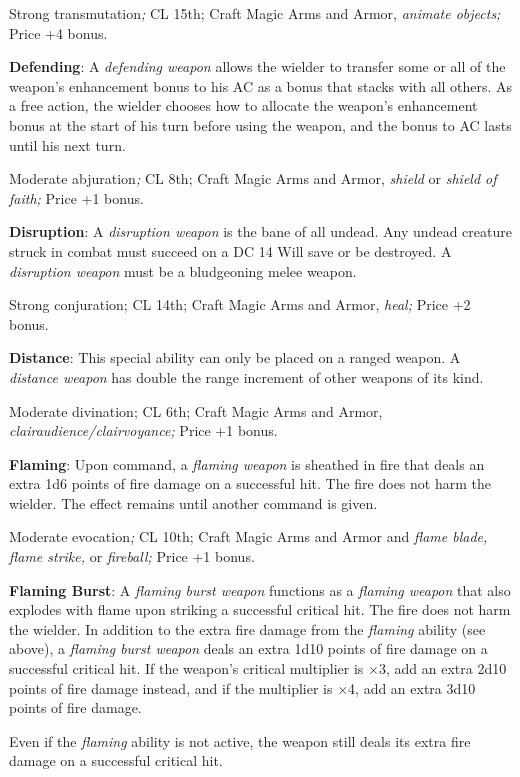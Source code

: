 Strong transmutation\textit{; }CL 15th; Craft Magic Arms and Armor, \textit{animate objects; }Price +4 bonus.
				
\textbf{Defending}: A \textit{defending weapon} allows the wielder to transfer some or all of the weapon's enhancement bonus to his AC as a bonus that stacks with all others. As a free action, the wielder chooses how to allocate the weapon's enhancement bonus at the start of his turn before using the weapon, and the bonus to AC lasts until his next turn.
				
Moderate abjuration\textit{; }CL 8th; Craft Magic Arms and Armor, \textit{shield }or \textit{shield of faith; }Price +1 bonus.
				
\textbf{Disruption}: A \textit{disruption weapon} is the bane of all undead. Any undead creature struck in combat must succeed on a DC 14 Will save or be destroyed. A \textit{disruption weapon} must be a bludgeoning melee weapon.
				
Strong conjuration; CL 14th; Craft Magic Arms and Armor, \textit{heal; }Price +2 bonus.
				
\textbf{Distance}: This special ability can only be placed on a ranged weapon. A \textit{distance weapon} has double the range increment of other weapons of its kind.
				
Moderate divination; CL 6th; Craft Magic Arms and Armor, \textit{clairaudience/clairvoyance; }Price +1 bonus.
				
\textbf{Flaming}: Upon command, a \textit{flaming weapon} is sheathed in fire that deals an extra 1d6 points of fire damage on a successful hit. The fire does not harm the wielder. The effect remains until another command is given. 
				
Moderate evocation\textit{; }CL 10th; Craft Magic Arms and Armor and \textit{flame blade, flame strike, }or \textit{fireball; }Price +1 bonus.
				
\textbf{Flaming Burst}: A \textit{flaming burst weapon} functions as a \textit{flaming weapon} that also explodes with flame upon striking a successful critical hit. The fire does not harm the wielder. In addition to the extra fire damage from the \textit{flaming} ability (see above), a \textit{flaming burst weapon} deals an extra 1d10 points of fire damage on a successful critical hit. If the weapon's critical multiplier is \mbox{$\times$}3, add an extra 2d10 points of fire damage instead, and if the multiplier is \mbox{$\times$}4, add an extra 3d10 points of fire damage. 
				
Even if the \textit{flaming} ability is not active, the weapon still deals its extra fire damage on a successful critical hit.
				
